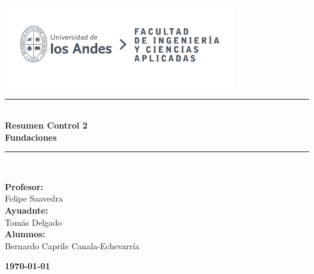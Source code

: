 \documentclass{article} %
\begin{document}
\begin{titlepage}%
\newcommand{\HRule}{\rule{\linewidth}{0.5mm}} 
\center 
\includegraphics[width=10cm]{Graficos/LOGO_UNIVERSIDAD.jpg}\\ %
\vspace{3cm}
\HRule \\[0.4cm]
{ \huge \bfseries Resumen Control 2}\\[0.4cm] %
{ \huge \bfseries Fundaciones}\\[0.4cm] %
\HRule \\[1.5cm]
 \vspace{5cm}
\begin{flushright}
    { \textbf{Profesor:}\\
    Felipe Saavedra\\
    \vspace{0.2cm}
    \textbf{Ayuadnte:}\\
    Tomás Delgado\\
    \vspace{0.2cm}
    \textbf{Alumnos:}\\
    Bernardo Caprile Canala-Echevarría\\
    \vspace{0.2cm}

}
\end{flushright}
\vspace{1cm}
{\large \textbf{\today}}\\[2cm] %
\end{titlepage}
\end{document}

